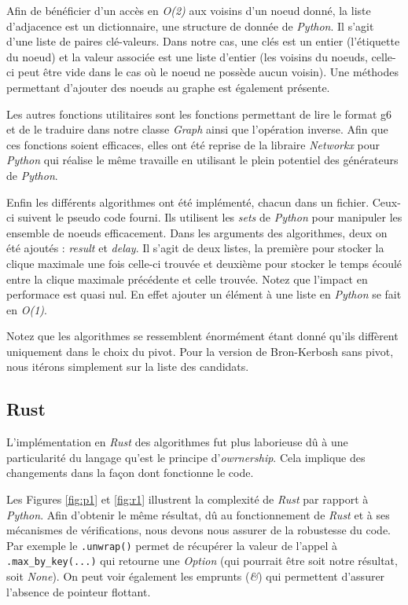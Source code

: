 \documentclass[12pt,a4paper]{article}
\begin{document}
Afin de bénéficier d'un accès en \emph{O(2)} aux voisins d'un noeud donné, la liste d'adjacence est un dictionnaire, une structure de donnée de \emph{Python}. Il s'agit d'une liste de paires clé-valeurs. Dans notre cas, une clés est un entier (l'étiquette du noeud) et la valeur associée est une liste d'entier (les voisins du noeuds, celle-ci peut être vide dans le cas où le noeud ne possède aucun voisin).
Une méthodes permettant d'ajouter des noeuds au graphe est également présente.

Les autres fonctions utilitaires sont les fonctions permettant de lire le format g6 et de le traduire dans notre classe \emph{Graph} ainsi que l'opération inverse. Afin que ces fonctions soient efficaces, elles ont été reprise de la libraire \emph{Networkx} pour \emph{Python} qui réalise le même travaille en utilisant le plein potentiel des générateurs de \emph{Python}.

Enfin les différents algorithmes ont été implémenté, chacun dans un fichier. Ceux-ci suivent le pseudo code fourni. Ils utilisent les \emph{sets} de \emph{Python} pour manipuler les ensemble de noeuds efficacement. Dans les arguments des algorithmes, deux on été ajoutés : \emph{result} et \emph{delay}. Il s'agit de deux listes, la première pour stocker la clique maximale une fois celle-ci trouvée et deuxième pour stocker le temps écoulé entre la clique maximale précédente et celle trouvée. Notez que l'impact en performace est quasi nul. En effet ajouter un élément à une liste en \emph{Python} se fait en \emph{O(1)}.

Notez que les algorithmes se ressemblent énormément étant donné qu'ils diffèrent uniquement dans le choix du pivot. Pour la version de Bron-Kerbosh sans pivot, nous itérons simplement sur la liste des candidats.

\subsection{Rust}%
\label{subsec:rust}

L'implémentation en \emph{Rust} des algorithmes fut plus laborieuse dû à une particularité du langage qu'est le principe d'\emph{owrnership}\cite{rust}. Cela implique des changements dans la façon dont fonctionne le code.

Les Figures \ref{fig:p1} et \ref{fig:r1} illustrent la complexité de \emph{Rust} par rapport à \emph{Python}. Afin d'obtenir le même résultat, dû au fonctionnement de \emph{Rust} et à ses mécanismes de vérifications, nous devons nous assurer de la robustesse du code. Par exemple le \verb|.unwrap()| permet de récupérer la valeur de l'appel à \verb|.max_by_key(...)| qui retourne une \emph{Option} (qui pourrait être soit notre résultat, soit \emph{None}). On peut voir également les emprunts (\emph{\&}) qui permettent d'assurer l'absence de pointeur flottant.
\end{document}
